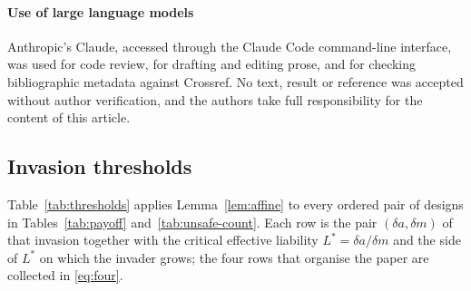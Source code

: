 \documentclass[pdflatex]{sn-jnl}
\theoremstyle{thmstyleone}
\theoremstyle{thmstylethree}
\theoremstyle{thmstyletwo}
\begin{document}
\paragraph{Use of large language models}
Anthropic's Claude, accessed through the Claude Code command-line interface,
was used for code review, for drafting and editing prose, and for checking
bibliographic metadata against Crossref. No
text, result or reference was accepted without author verification, and the
authors take full responsibility for the content of this article.

\begin{appendices}

\renewcommand{\theHtable}{app.\thetable}
\renewcommand{\theHfigure}{app.\thefigure}

\section{Invasion thresholds}\label{app:tables}

Table~\ref{tab:thresholds} applies Lemma~\ref{lem:affine} to every ordered
pair of designs in Tables~\ref{tab:payoff} and~\ref{tab:unsafe-count}. Each
row is the pair $(\delta a,\delta m)$ of that invasion together with the
critical effective liability $L^{*}=\delta a/\delta m$ and the side of
$L^{*}$ on which the invader grows; the four rows that organise the paper are
collected in \eqref{eq:four}.


\end{appendices}
\end{document}
